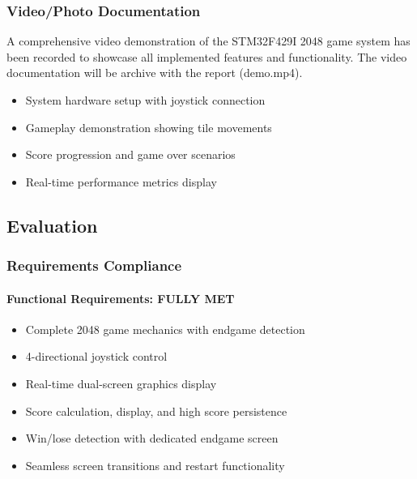 \documentclass[12pt,a4paper]{article}
\begin{document}
\subsubsection{Video/Photo Documentation}

A comprehensive video demonstration of the STM32F429I 2048 game system has been recorded to showcase all implemented features and functionality. The video documentation will be archive with the report (demo.mp4).

\begin{itemize}[leftmargin=*]
    \item System hardware setup with joystick connection
    \item Gameplay demonstration showing tile movements
    \item Score progression and game over scenarios
    \item Real-time performance metrics display
\end{itemize}

\subsection{Evaluation}

\subsubsection{Requirements Compliance}

\paragraph{Functional Requirements: \textcolor{green}{\checkmark} FULLY MET}
\begin{itemize}[leftmargin=*]
    \item[\textcolor{green}{\checkmark}] Complete 2048 game mechanics with endgame detection
    \item[\textcolor{green}{\checkmark}] 4-directional joystick control
    \item[\textcolor{green}{\checkmark}] Real-time dual-screen graphics display
    \item[\textcolor{green}{\checkmark}] Score calculation, display, and high score persistence
    \item[\textcolor{green}{\checkmark}] Win/lose detection with dedicated endgame screen
    \item[\textcolor{green}{\checkmark}] Seamless screen transitions and restart functionality
\end{itemize}
\end{document}
